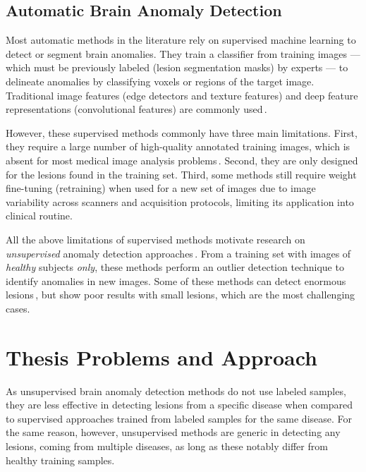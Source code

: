 \subsection{Automatic Brain Anomaly Detection}
Most automatic methods in the literature rely on supervised machine learning to detect or segment brain anomalies. They train a classifier from training images --- which must be previously labeled (\eg lesion segmentation masks) by experts --- to delineate anomalies by classifying voxels or regions of the target image. Traditional image features (\eg edge detectors and texture features) and deep feature representations (\eg convolutional features) are commonly used\,\cite{Soltaninejad-2017-AutomatedBrainSuperpixel,Goetz-2014-ExtremelyRandomized,Geremia-2011-NEURO-MSLesion,Pinto-2015-EMBC-BrainTumourSeg,Kooi-2017-MEDIA-DLForMamographicLesions,Aslani-2018-DeepAE-MICCAI,Gao-2014-HBM-ShapeAnalysis,Shakeri-2016-CMIG-StatisticalShapeAnalysis}.

However, these supervised methods commonly have three main limitations. First, they require a large number of high-quality annotated training images, which is absent for most medical image analysis problems\,\cite{Akkus-2017-DLForBrainSegmentation,Thyreau-2018-MEDIA-SegmentationHippocampus,Havaei:2017:BrainTumourSegWithDL}. Second, they are only designed for the lesions found in the training set. Third, some methods still require weight fine-tuning (retraining) when used for a new set of images due to image variability across scanners and acquisition protocols, limiting its application into clinical routine. 

All the above limitations of supervised methods motivate research on \emph{unsupervised} anomaly detection approaches\,\cite{Martins-2019-ISBI-SAAD,Sato-2018-SPIE-AnomalyDetection,Baur-2018-MICCAI-DeepAutoencoding,Guo-2015-AutomatedLesionDetectionOnMRI,Chen-2018-DeepGenerative}. From a training set with images of \emph{healthy} subjects \emph{only}, these methods perform an outlier detection technique to identify anomalies in new images. Some of these methods can detect enormous lesions\,\cite{Sato-2018-SPIE-AnomalyDetection,Chen-2018-DeepGenerative}, but show poor results with small lesions, which are the most challenging cases.


\section{Thesis Problems and Approach}
\label{sec:thesis_problem}
As unsupervised brain anomaly detection methods do not use labeled samples, they are less effective in detecting lesions from a specific disease when compared to supervised approaches trained from labeled samples for the same disease. For the same reason, however, unsupervised methods are generic in detecting any lesions, \eg coming from multiple diseases, as long as these notably differ from healthy training samples. 

